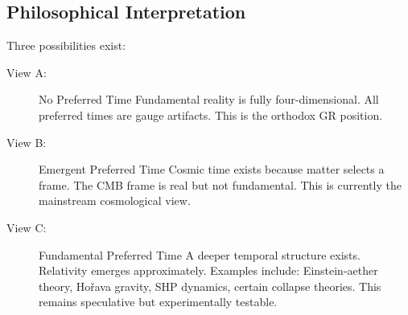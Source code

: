 \subsection{ Philosophical Interpretation}
Three possibilities exist:
\begin{description}
    \item [ View A:]  No Preferred Time
Fundamental reality is fully four-dimensional.
All preferred times are gauge artifacts.
This is the orthodox GR position.
    \item [ View B:]  Emergent Preferred Time
Cosmic time exists because matter selects a frame.
The CMB frame is real but not fundamental.
This is currently the mainstream cosmological view.
    \item [ View C:]  Fundamental Preferred Time
A deeper temporal structure exists.
Relativity emerges approximately.
Examples include:
Einstein-aether theory,
Hořava gravity,
SHP dynamics,
certain collapse theories.
This remains speculative but experimentally testable.
\end{description}


